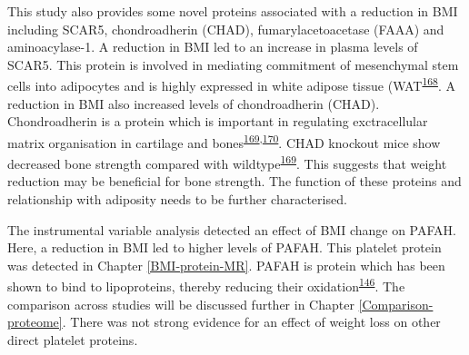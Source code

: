 \documentclass[11pt,twoside]{bristolthesis}
\begin{document}
This study also provides some novel proteins associated with a reduction in BMI including SCAR5, chondroadherin (CHAD), fumarylacetoacetase (FAAA) and aminoacylase-1. A reduction in BMI led to an increase in plasma levels of SCAR5. This protein is involved in mediating commitment of mesenchymal stem cells into adipocytes and is highly expressed in white adipose tissue (WAT\textsuperscript{\protect\hyperlink{ref-Lee2017a}{168}}. A reduction in BMI also increased levels of chondroadherin (CHAD). Chondroadherin is a protein which is important in regulating exctracellular matrix organisation in cartilage and bones\textsuperscript{\protect\hyperlink{ref-Hessle2013}{169},\protect\hyperlink{ref-Iozzo2015}{170}}. CHAD knockout mice show decreased bone strength compared with wildtype\textsuperscript{\protect\hyperlink{ref-Hessle2013}{169}}. This suggests that weight reduction may be beneficial for bone strength. The function of these proteins and relationship with adiposity needs to be further characterised.

The instrumental variable analysis detected an effect of BMI change on PAFAH. Here, a reduction in BMI led to higher levels of PAFAH. This platelet protein was detected in Chapter \ref{BMI-protein-MR}. PAFAH is protein which has been shown to bind to lipoproteins, thereby reducing their oxidation\textsuperscript{\protect\hyperlink{ref-Noto2003}{146}}. The comparison across studies will be discussed further in Chapter \ref{Comparison-proteome}. There was not strong evidence for an effect of weight loss on other direct platelet proteins.
\end{document}
